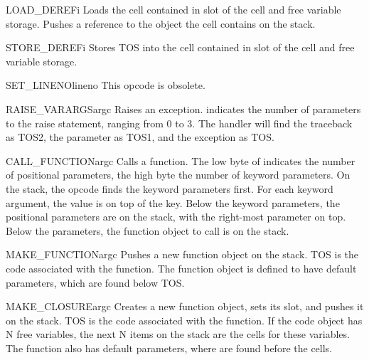 \begin{opcodedesc}{LOAD_DEREF}{i}
Loads the cell contained in slot  of the cell and free variable
storage.  Pushes a reference to the object the cell contains on the
stack. 
\end{opcodedesc}

\begin{opcodedesc}{STORE_DEREF}{i}
Stores TOS into the cell contained in slot  of the cell and
free variable storage.
\end{opcodedesc}

\begin{opcodedesc}{SET_LINENO}{lineno}
This opcode is obsolete.
\end{opcodedesc}

\begin{opcodedesc}{RAISE_VARARGS}{argc}
Raises an exception.  indicates the number of parameters
to the raise statement, ranging from 0 to 3.  The handler will find
the traceback as TOS2, the parameter as TOS1, and the exception
as TOS.
\end{opcodedesc}

\begin{opcodedesc}{CALL_FUNCTION}{argc}
Calls a function.  The low byte of  indicates the number of
positional parameters, the high byte the number of keyword parameters.
On the stack, the opcode finds the keyword parameters first.  For each
keyword argument, the value is on top of the key.  Below the keyword
parameters, the positional parameters are on the stack, with the
right-most parameter on top.  Below the parameters, the function object
to call is on the stack.
\end{opcodedesc}

\begin{opcodedesc}{MAKE_FUNCTION}{argc}
Pushes a new function object on the stack.  TOS is the code associated
with the function.  The function object is defined to have 
default parameters, which are found below TOS.
\end{opcodedesc}

\begin{opcodedesc}{MAKE_CLOSURE}{argc}
Creates a new function object, sets its  slot, and
pushes it on the stack.  TOS is the code associated with the function.
If the code object has N free variables, the next N items on the stack
are the cells for these variables.  The function also has 
default parameters, where are found before the cells.
\end{opcodedesc}

